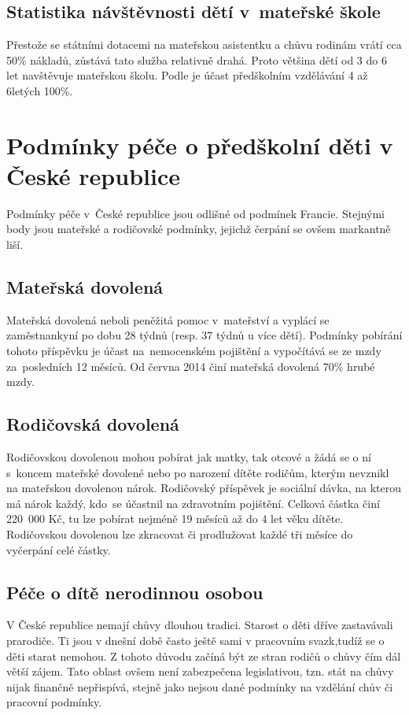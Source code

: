 			\subsection{Statistika návštěvnosti dětí v mateřské škole}
			\label{statistika}
				Přestože se státními dotacemi na mateřskou asistentku a chůvu rodinám vrátí cca 50\% nákladů, zůstává tato služba relativně drahá. Proto většina dětí od 3 do 6 let navštěvuje mateřskou školu. Podle \cite{Eurydice} je účast předškolním vzdělávání 4 až 6letých 100\%.
			

		\section{Podmínky péče o předškolní děti v České republice}
			Podmínky péče v České republice jsou odlišné od podmínek Francie. Stejnými body jsou mateřské a rodičovské podmínky, jejichž čerpání se ovšem markantně liší.

			\subsection{Mateřská dovolená}
				Mateřská dovolená neboli peněžitá pomoc v mateřství a vyplácí se zaměstnankyní po dobu 28 týdnů (resp. 37 týdnů u více dětí). Podmínky pobírání tohoto příspěvku je účast na nemocenském pojištění a vypočítává se ze mzdy za posledních 12 měsíců. Od června 2014 činí mateřská dovolená 70\% hrubé mzdy. \citep{materska}

			\subsection{Rodičovská dovolená}
				Rodičovskou dovolenou mohou pobírat jak matky, tak otcové a žádá se o ní s koncem mateřské dovolené nebo po narození dítěte rodičům, kterým nevznikl na mateřskou dovolenou nárok. Rodičovský příspěvek je sociální dávka, na kterou má nárok každý, kdo se účastnil na zdravotním pojištění. Celková částka činí 220 000 Kč, tu lze pobírat nejméně 19 měsíců až do 4 let věku dítěte. Rodičovskou dovolenou lze zkracovat či prodlužovat každé tři měsíce do vyčerpání celé částky. \citep{rodicovska}

			\subsection{Péče o dítě nerodinnou osobou}
				V České republice nemají chůvy dlouhou tradici. Starost o děti dříve zastavávali prarodiče. Ti jsou v dnešní době často ještě sami v pracovním svazk,tudíž se o děti starat nemohou. Z tohoto důvodu začíná být ze stran rodičů o chůvy čím dál větší zájem. Tato oblast ovšem není zabezpečena legislativou, tzn. stát na chůvy nijak finančně nepřispívá, stejně jako nejsou dané podmínky na vzdělání chův či pracovní podmínky. 



